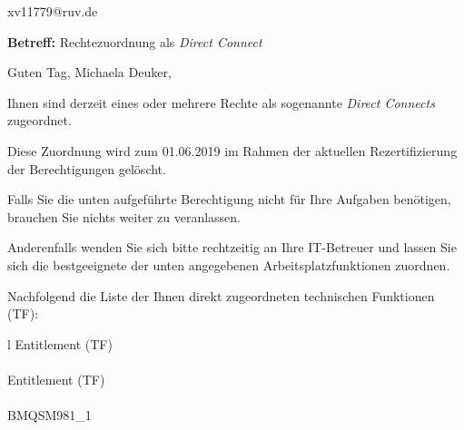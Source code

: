 \documentclass[a4paper,landscape,12pt]{letter}
\begin{document}
\begin{letter}{xv11779@ruv.de\hfill \break}
\begin{normalsize}
	\opening{\textbf{Betreff:} Rechtezuordnung als \emph{Direct Connect}}
	\begin{normalsize} \hfill
	\end{normalsize}

	\begin{normalsize}
		Guten Tag, 
	Michaela Deuker, \hfill \break
	\end{normalsize}
	\end{normalsize}
	
\begin{normalsize}
	Ihnen sind derzeit eines oder mehrere Rechte als sogenannte \emph{Direct Connects} zugeordnet.
	
	Diese Zuordnung wird zum 01.06.2019 im Rahmen der aktuellen Rezertifizierung der Berechtigungen gelöscht.
	
	Falls Sie die unten aufgeführte Berechtigung nicht für Ihre Aufgaben benötigen, 
	brauchen Sie nichts weiter zu veranlassen.
	
	Anderenfalls wenden Sie sich bitte rechtzeitig an Ihre IT-Betreuer 
	und lassen Sie sich die bestgeeignete der unten angegebenen Arbeitsplatzfunktionen zuordnen.
	\end{normalsize}
	
\begin{normalsize}
	Nachfolgend die Liste der Ihnen direkt zugeordneten technischen Funktionen (TF):

	\begin{longtable}{l}
		Entitlement (TF) \\ \hline
		\endfirsthead
		\\\hline
		Entitlement (TF) \\ \hline
		\endhead %
		\multicolumn{1}{r@{}}{Fortsetzung \ldots}\\
		\endfoot
		\hline
		\endlastfoot
	BMQSM981\_1\\
	\end{longtable}
	\end{normalsize}
	

\end{letter}
\end{document}
